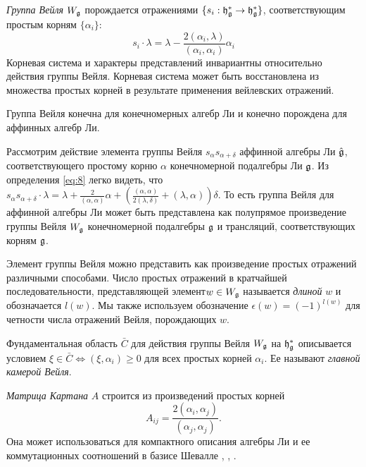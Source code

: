  {\it Группа Вейля} $W_{\mathfrak{g}}$ порождается отражениями $\{s_{i}:\mathfrak{h}_{\mathfrak{g}}^{*}\to\mathfrak{h}_{\mathfrak{g}}^{*}\}$, соответствующим простым корням $\{\alpha_{i}\}$:
\begin{equation}
  \label{eq:8}
  s_{i}\cdot\lambda=\lambda-\frac{2(\alpha_{i},\lambda)}{(\alpha_{i},\alpha_{i})}\alpha_{i}
\end{equation}
Корневая система и характеры представлений инвариантны относительно действия группы Вейля. Корневая система может быть восстановлена из множества простых корней в результате применения вейлевских отражений.

Группа Вейля конечна для конечномерных алгебр Ли и конечно порождена для аффинных алгебр Ли.

Рассмотрим действие элемента группы Вейля $s_{\alpha}s_{\alpha+\delta}$ аффинной алгебры Ли   $\hat{\mathfrak{g}}$, соответствующего простому корню  $\alpha$ конечномерной подалгебры Ли $\mathfrak{g}$. Из определения  \eqref{eq:8} легко видеть, что $s_{\alpha}s_{\alpha+\delta} \cdot \lambda=\lambda+\frac{2}{(\alpha,\alpha)}\alpha+\left(\frac{(\alpha,\alpha)}{2 (\lambda,\delta)}+(\lambda,\alpha)\right) \delta$. То есть группа Вейля для аффинной алгебры Ли может быть представлена как полупрямое произведение группы Вейля $W_{\mathfrak{g}}$ конечномерной подалгебры  $\mathfrak{g}$ и трансляций, соответствующих корням $\mathfrak{g}$. 

Элемент группы Вейля можно представить как произведение простых отражений различными способами. Число простых отражений в кратчайшей последовательности, представляющей элемент$w\in W_{\mathfrak{g}}$ называется {\it длиной}  $w$ и обозначается $l(w)$. Мы также используем обозначение $\epsilon(w)=(-1)^{l(w)}$ для четности числа отражений Вейля, порождающих $w$. 

Фундаментальная область $\bar{C}$ для действия группы Вейля $W_{\mathfrak{g}}$ на $\mathfrak{h}_{\mathfrak{g}}^{*}$ описывается условием $\xi\in \bar{C}\Leftrightarrow (\xi,\alpha_{i})\geq 0$ для всех простых корней $\alpha_{i}$. Ее называют {\it главной камерой Вейля}. 

{\it Матрица Картана} $A$ строится из произведений простых корней
\begin{equation}
  \label{eq:9}
  A_{ij}=\frac{2(\alpha_{i},\alpha_{j})}{(\alpha_{j},\alpha_{j})}.
\end{equation}
Она может использоваться для компактного описания алгебры Ли и ее коммутационных соотношений в базисе Шевалле \cite{humphreys1997introduction}, \cite{fulton1991representation}, \cite{bourbaki2002lie}.

